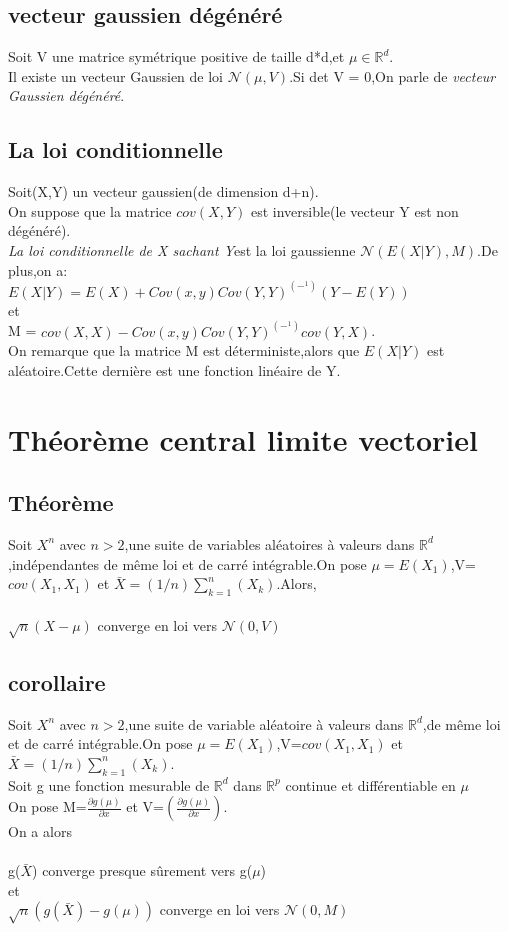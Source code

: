 \documentclass{book}
\begin{document}
		\section{vecteur gaussien dégénéré}
		  Soit V une matrice symétrique positive de taille d*d,et $\mu\in \mathbb{R}^d$.\\Il existe un vecteur Gaussien de loi $\mathcal{N}(\mu,V)$.Si det V = 0,On parle de \emph{vecteur Gaussien dégénéré}.
		
		\section{La loi conditionnelle}
		  Soit(X,Y) un vecteur gaussien(de dimension d+n).\\On suppose que la matrice $cov(X,Y)$ est inversible(le vecteur Y est non dégénéré).\\\emph{La loi conditionnelle de X sachant Y}est la loi gaussienne $\mathcal{N}(E(X|Y),M)$.De plus,on a: \\$E(X|Y) = E(X) + Cov(x,y) Cov(Y,Y)^(-^1)  (Y- E(Y))$ \\et\\M = $cov(X,X)- Cov(x,y) Cov(Y,Y)^(-^1)  cov(Y,X)$.\\On remarque que la matrice M est déterministe,alors que $E(X|Y)$ est aléatoire.Cette dernière est une fonction linéaire de Y.
		
		
        \chapter{Théorème central limite vectoriel}
        \section{Théorème}
         Soit $X^n$ avec $n>2$,une suite de variables aléatoires à valeurs dans $\mathbb{R}^d$,indépendantes de même loi et de carré intégrable.On pose $\mu=E(X_1)$,V=$cov(X_1,X_1)$ et $\bar{X} =(1/n)\sum_{k=1}^{n}(X_k)$.Alors,\\\\$\sqrt{n}(X-\mu)$ converge en loi vers $\mathcal{N}(0,V)$
        \section{corollaire}
          Soit $X^n$ avec $n>2$,une suite de variable aléatoire à valeurs dans $\mathbb{R}^d$,de même loi et de carré intégrable.On pose $\mu = E(X_1)$,V=$cov(X_1,X_1)$ et $\bar{X} =(1/n)\sum_{k=1}^{n}(X_k)$.\\Soit g une fonction mesurable de $\mathbb{R}^d$ dans $\mathbb{R}^p$ continue et différentiable en $\mu$\\On pose M=$\frac{\partial g(\mu)}{\partial x}$ et V=$(\frac{\partial g(\mu)}{\partial x})$.\\On a alors\\\\g($\bar{X}$) converge presque sûrement vers g($\mu$)\\et\\$\sqrt{n}(g(\bar{X})-g(\mu))$ converge en loi vers $\mathcal{N}(0,M)$
\end{document}
